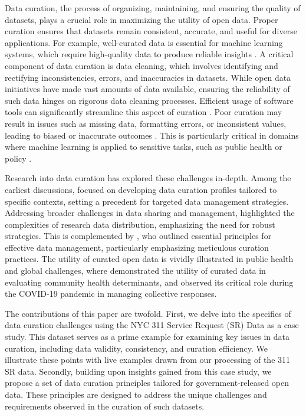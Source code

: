 \documentclass[linenumber]{jdsart}
\begin{document}
Data curation, the process of organizing, maintaining, and ensuring
the quality of datasets, plays a crucial role in maximizing the
utility of open data. Proper curation ensures that datasets remain
consistent, accurate, and useful for diverse applications. For example, 
well\mbox{-}curated data is essential for machine learning systems, which 
require high\mbox{-}quality data to produce reliable insights 
\citep{polyzotis2019data, jain2020overview}. A critical component of 
data curation is data cleaning, which involves identifying and rectifying 
inconsistencies, errors, and inaccuracies in datasets. While open data 
initiatives have made vast amounts of data available, ensuring the 
reliability of such data hinges on rigorous data cleaning processes. 
Efficient usage of software tools can significantly streamline this 
aspect of curation \citep[e.g.,][]{cody2017cody, van2018statistical}. Poor 
curation may result in issues such as missing data, formatting errors, 
or inconsistent values, leading to biased or inaccurate outcomes 
\citep{geiger2020garbage}. This is particularly critical in domains 
where machine learning is applied to sensitive tasks, such as public 
health or policy \citep{rahm2000data}.


Research into data curation has explored these challenges in\mbox{-}depth. 
Among the earliest discussions, \citet{witt2009constructing} focused 
on developing data curation profiles tailored to specific contexts, 
setting a precedent for targeted data management strategies. 
Addressing broader challenges in data sharing and management, 
\citet{borgman2012conundrum} highlighted the complexities of 
research data distribution, emphasizing the need for robust 
strategies. This is complemented by \citet{hart2016ten}, who outlined 
essential principles for effective data management, particularly 
emphasizing meticulous curation practices. The utility of curated 
open data is vividly illustrated in public health and global challenges, 
where \citet{cantor2018facets} demonstrated the utility of curated 
data in evaluating community health determinants, and 
\citet{shankar2021data} observed its critical role during the 
COVID\mbox{-}19 pandemic in managing collective responses.


The contributions of this paper are twofold. First, we delve into
the specifics of data curation challenges using the NYC 311 Service
Request (SR) Data as a case study. This dataset serves as a prime 
example for examining key issues in data curation, including data 
validity, consistency, and curation efficiency. We illustrate these 
points with live examples drawn from our 
processing of the 311 SR data. Secondly, building upon insights 
gained from this case study, we propose a set of data curation 
principles tailored for government\mbox{-}released open data. These 
principles are designed to address the unique challenges 
and requirements observed in the curation of such datasets.
\end{document}
